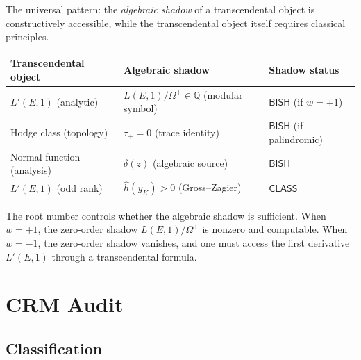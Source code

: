 \documentclass[11pt]{article}
\theoremstyle{plain}
\theoremstyle{definition}
\theoremstyle{remark}
\newcommand{\Q}{\mathbb{Q}}
\newcommand{\BISH}{\ensuremath{\mathsf{BISH}}}
\newcommand{\CLASS}{\ensuremath{\mathsf{CLASS}}}
\newcommand{\hhat}{\hat{h}}
\begin{document}
The universal pattern: the \emph{algebraic shadow} of a transcendental object is constructively accessible, while the transcendental object itself requires classical principles.

\begin{center}
\begin{tabular}{lll}
\toprule
\textbf{Transcendental object} & \textbf{Algebraic shadow} & \textbf{Shadow status} \\
\midrule
$L'(E,1)$ (analytic) & $L(E,1)/\Omega^+ \in \Q$ (modular symbol) & $\BISH$ (if $w = +1$) \\
Hodge class (topology) & $\tau_+ = 0$ (trace identity) & $\BISH$ (if palindromic) \\
Normal function (analysis) & $\delta(z)$ (algebraic source) & $\BISH$ \\
$L'(E,1)$ (odd rank) & $\hhat(y_K) > 0$ (Gross--Zagier) & $\CLASS$ \\
\bottomrule
\end{tabular}
\end{center}

The root number controls whether the algebraic shadow is sufficient. When $w = +1$, the zero-order shadow $L(E,1)/\Omega^+$ is nonzero and computable. When $w = -1$, the zero-order shadow vanishes, and one must access the first derivative $L'(E,1)$ through a transcendental formula.


\section{CRM Audit}
\label{sec:audit}

\subsection{Classification}
\end{document}
